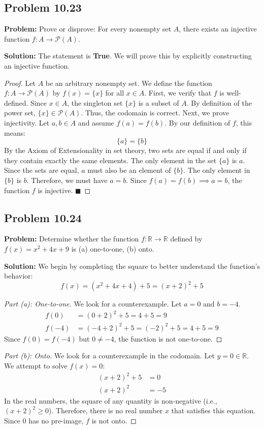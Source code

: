 \documentclass[11pt, a4paper]{article}
\theoremstyle{definition}
\theoremstyle{remark}
\newcommand{\R}{\mathbb{R}}
\begin{document}
\subsection{Problem 10.23}
\textbf{Problem:} Prove or disprove: For every nonempty set $A$, there exists an injective function $f : A \to \mathcal{P}(A)$.

\textbf{Solution:}
The statement is \textbf{True}. We will prove this by explicitly constructing an injective function.
\begin{proof}
Let $A$ be an arbitrary nonempty set. We define the function $f: A \to \mathcal{P}(A)$ by $f(x) = \{x\}$ for all $x \in A$. 
First, we verify that $f$ is well-defined. Since $x \in A$, the singleton set $\{x\}$ is a subset of $A$. By definition of the power set, $\{x\} \in \mathcal{P}(A)$. Thus, the codomain is correct.
Next, we prove injectivity. Let $a, b \in A$ and assume $f(a) = f(b)$. By our definition of $f$, this means:
\[ \{a\} = \{b\} \]
By the Axiom of Extensionality in set theory, two sets are equal if and only if they contain exactly the same elements. The only element in the set $\{a\}$ is $a$. Since the sets are equal, $a$ must also be an element of $\{b\}$. The only element in $\{b\}$ is $b$. Therefore, we must have $a = b$. 
Since $f(a) = f(b) \implies a = b$, the function $f$ is injective. $\blacksquare$
\end{proof}

\subsection{Problem 10.24}
\textbf{Problem:} Determine whether the function $f : \R \to \R$ defined by $f(x) = x^2 + 4x + 9$ is (a) one-to-one, (b) onto.

\textbf{Solution:}
We begin by completing the square to better understand the function's behavior:
\[ f(x) = (x^2 + 4x + 4) + 5 = (x + 2)^2 + 5 \]
\begin{proof}[Part (a): One-to-one]
We look for a counterexample. Let $a = 0$ and $b = -4$. 
\begin{align*}
f(0) &= (0 + 2)^2 + 5 = 4 + 5 = 9 \\
f(-4) &= (-4 + 2)^2 + 5 = (-2)^2 + 5 = 4 + 5 = 9
\end{align*}
Since $f(0) = f(-4)$ but $0 \neq -4$, the function is not one-to-one.
\end{proof}
\begin{proof}[Part (b): Onto]
We look for a counterexample in the codomain. Let $y = 0 \in \R$. We attempt to solve $f(x) = 0$:
\begin{align*}
(x + 2)^2 + 5 &= 0 \\
(x + 2)^2 &= -5
\end{align*}
In the real numbers, the square of any quantity is non-negative (i.e., $(x+2)^2 \ge 0$). Therefore, there is no real number $x$ that satisfies this equation. Since $0$ has no pre-image, $f$ is not onto.
\end{proof}
\end{document}
